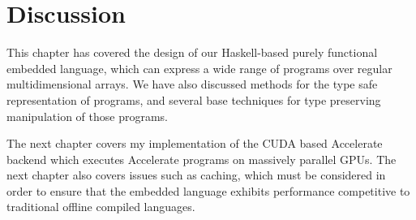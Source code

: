 \section{Discussion}

This chapter has covered the design of our Haskell-based purely functional
embedded language, which can express a wide range of programs over regular
multidimensional arrays. We have also discussed methods for the type safe
representation of programs, and several base techniques for type preserving
manipulation of those programs.

The next chapter covers my implementation of the CUDA based Accelerate backend
which executes Accelerate programs on massively parallel GPUs. The next chapter
also covers issues such as caching, which must be considered in order to ensure
that the embedded language exhibits performance competitive to traditional
offline compiled languages.

